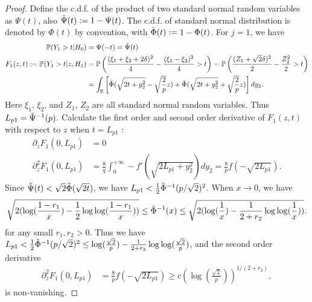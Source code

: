 \documentclass[12pt]{article}
\newcommand{\PP}{\mathbb{P}}
\newcommand{\R}{\mathbb{R}}
\def\PP{{\mathbb P}}
\theoremstyle{plain}
\begin{document}
\begin{proof}
	Define the c.d.f. of the product of two standard normal random variables as $\Psi(t)$, also $\Tilde \Psi(t) :=1-\Psi(t)$. The c.d.f. of standard normal distribution is denoted by $\Phi(t)$ by convention, with $\Tilde \Phi(t) :=1-\Phi(t)$. For $j=1$, we have 
	\begin{equation*}
		\begin{aligned}
			\PP(Y_1>t|H_0) &= \Psi(-t) = \Tilde{\Psi}(t)\\
			F_1(z,t):= \PP(Y_1>t|z,H_1) &=  \PP\left( \frac{(\xi_1+\xi_2+2\delta )^2}{4} -\frac{(\xi_1-\xi_2)^2}{4} >t \right)= \PP \left( \frac{(Z_1+\sqrt{2}\delta )^2}{2}-\frac{Z_2^2}{2} >t \right) \\
			& = \int_{\R} \left[ \Tilde{\Phi}(\sqrt{2t + y_2^2}-\sqrt{\frac{2}{p}} z ) + \Tilde{\Phi}(\sqrt{2t + y_2^2}+\sqrt{\frac{2}{p}}z ) \right]d y_2.
		\end{aligned}
	\end{equation*}
	Here $\xi_1$, $\xi_2$, and $Z_1$, $Z_2$ are all standard normal random variables. Thus $ L_{p 1} = \Tilde{\Psi}^{-1}(p)$. Calculate the first order and second order derivative of $F_1(z,t)$ with respect to $z$ when $t= L_{p 1}$ :
	\begin{equation*}
		\begin{aligned}
			\partial_z   F_1(0,L_{p 1}) & = 0 \\
			\partial_z^2   F_1(0,L_{p 1}) & = \frac{8}{q} \int_{0}^{+\infty} -  f'(\sqrt{2L_{p 1} + y_2^2} )  d y_2= \frac{8}{p} f(-\sqrt{2L_{p 1}}).
		\end{aligned}
	\end{equation*}
	Since $\Tilde{\Psi}(t)<\sqrt{2}\Tilde{\Phi} (\sqrt{2t})$, we have $L_{p 1}< \frac{1}{2} \Tilde{\Phi}^{-1}(p/\sqrt{2})^2 $. When $x\to 0$, we have 
	\begin{equation*}
		\sqrt{2(\log(\frac{1-r_1}{x}) -\frac{1}{2}\log\log (\frac{1-r_1}{x})  ) } \le\Tilde{\Phi}^{-1}(x)\le \sqrt{2(\log(\frac{1}{x}) -\frac{1}{2+r_2}\log\log (\frac{1}{x})  ) }.
	\end{equation*}
	for any small $r_1,r_2>0$. Thus we have $L_{p 1}< \frac{1}{2} \Tilde{\Phi}^{-1}(p/\sqrt{2})^2 \le \log(\frac{\sqrt{2}}{p}) - \frac{1}{2+r_2}\log\log (\frac{\sqrt{2}}{p})$, and the second order derivative 
	\begin{equation*}
		\begin{aligned}
			\partial_z^2   F_1(0,L_{p 1}) & = \frac{8}{p} f(-\sqrt{2L_{p 1}}) \ge c (\log(\frac{\sqrt{2}}{p}) )^{1/(2+r_2)},
		\end{aligned}
	\end{equation*}
	is non-vanishing.
	

\end{proof}
\end{document}
